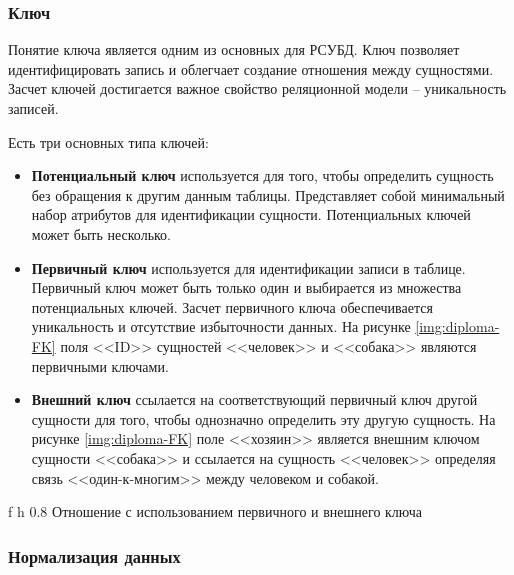 \subsubsection{Ключ}

Понятие ключа является одним из основных для РСУБД.
Ключ позволяет идентифицировать запись и облегчает создание отношения между сущностями.
Засчет ключей достигается важное свойство реляционной модели -- уникальность записей.

Есть три основных типа ключей:  
\begin{itemize}[label=---]
  
    \item \textbf{Потенциальный ключ} используется для того,
    чтобы определить сущность без обращения к другим данным таблицы.
    Представляет собой минимальный набор атрибутов для идентификации сущности.
    Потенциальных ключей может быть несколько.

    \item \textbf{Первичный ключ} используется для идентификации записи в таблице.
    Первичный ключ может быть только один и выбирается из множества потенциальных ключей.
    Засчет первичного ключа обеспечивается уникальность и отсутствие избыточности данных.
    На рисунке \ref{img:diploma-FK} поля <<ID>> сущностей <<человек>> и <<собака>> 
    являются первичными ключами.

    \item \textbf{Внешний ключ} ссылается на соответствующий первичный ключ другой сущности для того,
    чтобы однозначно определить эту другую сущность.
    На рисунке \ref{img:diploma-FK} поле <<хозяин>> является внешним ключом сущности <<собака>> и ссылается на сущность <<человек>>
    определяя связь <<один-к-многим>> между человеком и собакой.

\end{itemize}

\clearpage

    {f} %
    {h} %
    {0.8\textwidth} %
{Отношение с использованием первичного и внешнего ключа} %


\subsubsection{Нормализация данных}

